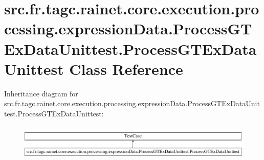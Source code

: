 \hypertarget{classsrc_1_1fr_1_1tagc_1_1rainet_1_1core_1_1execution_1_1processing_1_1expressionData_1_1Processf5d344d00bd46ca2801f8916309b84ab}{\section{src.\-fr.\-tagc.\-rainet.\-core.\-execution.\-processing.\-expression\-Data.\-Process\-G\-T\-Ex\-Data\-Unittest.\-Process\-G\-T\-Ex\-Data\-Unittest Class Reference}
\label{classsrc_1_1fr_1_1tagc_1_1rainet_1_1core_1_1execution_1_1processing_1_1expressionData_1_1Processf5d344d00bd46ca2801f8916309b84ab}
}
Inheritance diagram for src.\-fr.\-tagc.\-rainet.\-core.\-execution.\-processing.\-expression\-Data.\-Process\-G\-T\-Ex\-Data\-Unittest.\-Process\-G\-T\-Ex\-Data\-Unittest\-:\begin{figure}[H]
\begin{center}
\leavevmode
\includegraphics[height=1.717791cm]{classsrc_1_1fr_1_1tagc_1_1rainet_1_1core_1_1execution_1_1processing_1_1expressionData_1_1Processf5d344d00bd46ca2801f8916309b84ab}
\end{center}
\end{figure}
